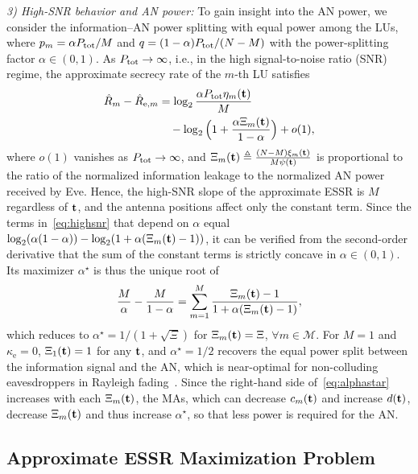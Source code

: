 \documentclass[journal]{IEEEtran}
\newcommand{\rev}[1]{{\color{red}#1}}
\newcommand{\rev}[1]{#1}
\begin{document}
\textit{3) High-SNR behavior and AN power:} To gain insight into the AN power, we consider the information--AN power splitting with equal power among the LUs, where $p_m=\alpha P_{\mathrm{tot}}/M$ and $q=(1-\alpha)P_{\mathrm{tot}}/(N-M)$ with the power-splitting factor $\alpha\in(0,1)$. As $P_{\mathrm{tot}}\to\infty$, i.e., in the high signal-to-noise ratio (SNR) regime, the approximate secrecy rate of the $m$-th LU satisfies
\begin{align}
\hat R_m-\hat R_{\mathrm{e},m}&=\log_2\frac{\alpha P_{\mathrm{tot}}\eta_m(\mathbf{t})}{M}\nonumber\\
&\quad-\log_2\Big(1+\frac{\alpha\Xi_m(\mathbf{t})}{1-\alpha}\Big)+o(1),\label{eq:highsnr}
\end{align}
where $o(1)$ vanishes as $P_{\mathrm{tot}}\to\infty$, and $\Xi_m(\mathbf{t})\triangleq\frac{(N-M)\xi_m(\mathbf{t})}{M\psi(\mathbf{t})}$ is proportional to the ratio of the normalized information leakage to the normalized AN power received by Eve. Hence, the high-SNR slope of the approximate ESSR is $M$ regardless of $\mathbf{t}$, and the antenna positions affect only the constant term. \rev{Since the terms in~\eqref{eq:highsnr} that depend on $\alpha$ equal $\log_2(\alpha(1-\alpha))-\log_2(1+\alpha(\Xi_m(\mathbf{t})-1))$, it can be verified from the second-order derivative that the sum of the constant terms is strictly concave in $\alpha\in(0,1)$. Its maximizer $\alpha^\star$ is thus the unique root of
\begin{equation}\label{eq:alphastar}
\frac{M}{\alpha}-\frac{M}{1-\alpha}=\sum_{m=1}^{M}\frac{\Xi_m(\mathbf{t})-1}{1+\alpha(\Xi_m(\mathbf{t})-1)},
\end{equation}
which reduces to $\alpha^\star=1/(1+\sqrt{\Xi})$ for $\Xi_m(\mathbf{t})=\Xi$, $\forall m\in\mathcal M$. \rev{For $M=1$ and $\kappa_{\mathrm e}=0$, $\Xi_1(\mathbf{t})=1$ for any $\mathbf{t}$, and $\alpha^\star=1/2$ recovers the equal power split between the information signal and the AN, which is near-optimal for non-colluding eavesdroppers in Rayleigh fading~\cite{Zhou2010}.} Since the right-hand side of~\eqref{eq:alphastar} increases with each $\Xi_m(\mathbf{t})$, the MAs, which can decrease $c_m(\mathbf{t})$ and increase $d(\mathbf{t})$, decrease $\Xi_m(\mathbf{t})$ and thus increase $\alpha^\star$,} so that less power is required for the AN.

\subsection{Approximate ESSR Maximization Problem}\label{sec:discussion}
\end{document}
